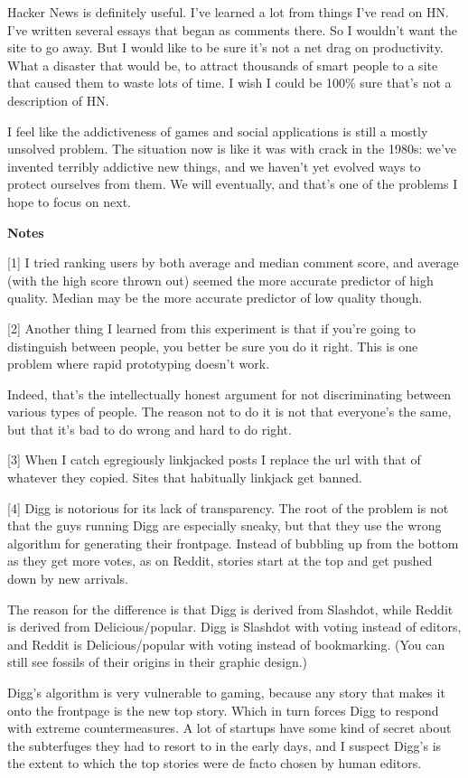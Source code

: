 Hacker News is definitely useful. I've learned a lot from things I've
read on HN. I've written several essays that began as comments there. So
I wouldn't want the site to go away. But I would like to be sure it's
not a net drag on productivity. What a disaster that would be, to
attract thousands of smart people to a site that caused them to waste
lots of time. I wish I could be 100\% sure that's not a description of
HN.

I feel like the addictiveness of games and social applications is still
a mostly unsolved problem. The situation now is like it was with crack
in the 1980s: we've invented terribly addictive new things, and we
haven't yet evolved ways to protect ourselves from them. We will
eventually, and that's one of the problems I hope to focus on next.

\textbf{Notes}

{[}1{]} I tried ranking users by both average and median comment score,
and average (with the high score thrown out) seemed the more accurate
predictor of high quality. Median may be the more accurate predictor of
low quality though.

{[}2{]} Another thing I learned from this experiment is that if you're
going to distinguish between people, you better be sure you do it right.
This is one problem where rapid prototyping doesn't work.

Indeed, that's the intellectually honest argument for not discriminating
between various types of people. The reason not to do it is not that
everyone's the same, but that it's bad to do wrong and hard to do right.

{[}3{]} When I catch egregiously linkjacked posts I replace the url with
that of whatever they copied. Sites that habitually linkjack get banned.

{[}4{]} Digg is notorious for its lack of transparency. The root of the
problem is not that the guys running Digg are especially sneaky, but
that they use the wrong algorithm for generating their frontpage.
Instead of bubbling up from the bottom as they get more votes, as on
Reddit, stories start at the top and get pushed down by new arrivals.

The reason for the difference is that Digg is derived from Slashdot,
while Reddit is derived from Delicious/popular. Digg is Slashdot with
voting instead of editors, and Reddit is Delicious/popular with voting
instead of bookmarking. (You can still see fossils of their origins in
their graphic design.)

Digg's algorithm is very vulnerable to gaming, because any story that
makes it onto the frontpage is the new top story. Which in turn forces
Digg to respond with extreme countermeasures. A lot of startups have
some kind of secret about the subterfuges they had to resort to in the
early days, and I suspect Digg's is the extent to which the top stories
were de facto chosen by human editors.

